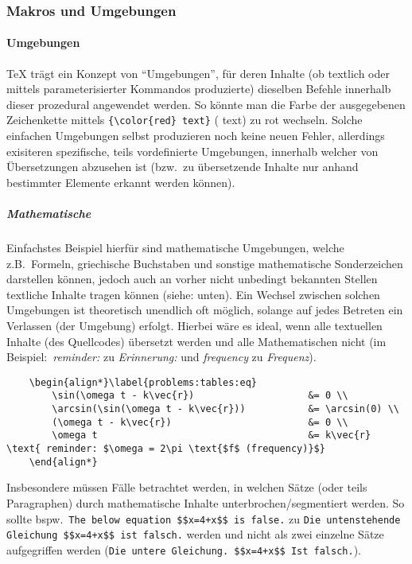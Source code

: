 \subsubsection{Makros und Umgebungen}
\paragraph{Umgebungen}\par
\TeX{} trägt ein Konzept von \enquote{Umgebungen}, für deren Inhalte (ob textlich oder mittels parameterisierter Kommandos produzierte) dieselben Befehle innerhalb dieser prozedural angewendet werden. So könnte man die Farbe der ausgegebenen Zeichenkette mittels \verb|{\color{red} text}| ({\color{red} text}) zu rot wechseln. Solche einfachen Umgebungen selbst produzieren noch keine neuen Fehler, allerdings exisiteren spezifische, teils vordefinierte Umgebungen, innerhalb welcher von Übersetzungen abzusehen ist (bzw.\ zu übersetzende Inhalte nur anhand bestimmter Elemente erkannt werden können). 
\subparagraph*{Mathematische}\par
Einfachstes Beispiel hierfür sind mathematische Umgebungen, welche z.B.\ Formeln, griechische Buchstaben und sonstige mathematische Sonderzeichen darstellen können, jedoch auch an vorher nicht unbedingt bekannten Stellen textliche Inhalte tragen können (siehe: unten). Ein Wechsel zwischen solchen Umgebungen ist theoretisch unendlich oft möglich, solange auf jedes Betreten ein Verlassen (der Umgebung) erfolgt. Hierbei wäre es ideal, wenn alle textuellen Inhalte (des Quellcodes) übersetzt werden und alle Mathematischen nicht (im Beispiel:\ \textit{reminder:} zu \textit{Erinnerung:} und \textit{frequency} zu \textit{Frequenz}). 
\begin{Verbatim}
    \begin{align*}\label{problems:tables:eq}
        \sin(\omega t - k\vec{r})                    &= 0 \\
        \arcsin(\sin(\omega t - k\vec{r}))           &= \arcsin(0) \\
        (\omega t - k\vec{r})                        &= 0 \\
        \omega t                                     &= k\vec{r} \text{ reminder: $\omega = 2\pi \text{$f$ (frequency)}$}
    \end{align*}
\end{Verbatim}
Insbesondere müssen Fälle betrachtet werden, in welchen Sätze (oder teils Paragraphen) durch mathematische Inhalte unterbrochen/segmentiert werden. So sollte bspw.\ \verb"The below equation $$x=4+x$$ is false." zu \verb"Die untenstehende Gleichung $$x=4+x$$ ist falsch." werden und nicht als zwei einzelne Sätze aufgegriffen werden (\verb"Die untere Gleichung. $$x=4+x$$ Ist falsch.").%
